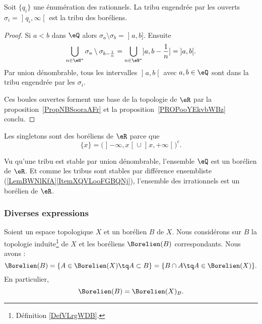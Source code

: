 \begin{lemma}   \label{LemZXnAbtl}
    Soit \( \{ q_i \}\) une énumération des rationnels. La tribu engendrée par les ouverts \( \sigma_i=\mathopen] q_i , \infty \mathclose[\) est la tribu des boréliens.
\end{lemma}

\begin{proof}
    Si \( a<b\) dans \( \eQ\) alors \( \sigma_a\setminus\sigma_b=\mathopen] a , b \mathclose]\). Ensuite
    \begin{equation}
        \bigcup_{n\in \eN^*}\sigma_a\setminus\sigma_{b-\frac{1}{ n }}=\bigcup_{n\in \eN^*}\mathopen] a , b-\frac{1}{ n } \mathclose]=\mathopen] a , b \mathclose[.
    \end{equation}
    Par union dénombrable, tous les intervalles \( \mathopen] a , b \mathclose[\) avec \( a,b\in \eQ\) sont dans la tribu engendrée par les \( \sigma_i\).

        Ces boules ouvertes forment une base de la topologie de \( \eR\) par la proposition~\ref{PropNBSooraAFr} et la proposition~\ref{PROPooYEkvbWBz} conclu.
\end{proof}

\begin{example}
    Les singletons sont des boréliens de \( \eR\) parce que
    \begin{equation}
    \{ x \}=\Big( \mathopen] -\infty , x \mathclose[\cup\mathopen] x , +\infty \mathclose[ \Big)^c.
    \end{equation}

    Vu qu'une tribu est stable par union dénombrable, l'ensemble \( \eQ\) est un borélien de \( \eR\). Et comme les tribus sont stables par différence ensembliste (\ref{LemBWNlKfA}\ref{ItemXQVLooFGBQNj}), l'ensemble des irrationnels est un borélien de \( \eR\).
\end{example}

\subsubsection{Diverses expressions}

\begin{lemma}   \label{LEMooUPYDooPVjscA}
    Soient un espace topologique \( X\) et un borélien \( B\) de \( X\). Nous considérons sur \( B\) la topologie induite\footnote{Définition \ref{DefVLrgWDB}.} de \( X\) et les boréliens \( \Borelien(B)\) correspondants. Nous avons :
    \begin{equation}
        \Borelien(B)=\{ A\in \Borelien(X)\tq A\subset B \}=\{ B\cap A\tq A\in \Borelien(X) \}.
    \end{equation}
    En particulier,
    \begin{equation}    \label{EQooEUWVooCBUims}
        \Borelien(B)=\Borelien(X)_B.
    \end{equation}
\end{lemma}

